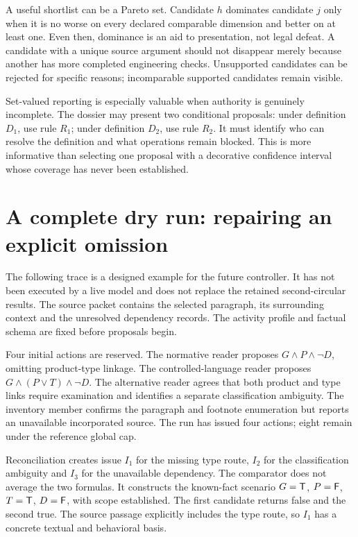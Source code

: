 A useful shortlist can be a Pareto set. Candidate $h$ dominates candidate $j$ only
when it is no worse on every declared comparable dimension and better on at least
one. Even then, dominance is an aid to presentation, not legal defeat. A candidate
with a unique source argument should not disappear merely because another has
more completed engineering checks. Unsupported candidates can be rejected for
specific reasons; incomparable supported candidates remain visible.

Set-valued reporting is especially valuable when authority is genuinely
incomplete. The dossier may present two conditional proposals: under definition
$D_1$, use rule $R_1$; under definition $D_2$, use rule $R_2$. It must identify who
can resolve the definition and what operations remain blocked. This is more
informative than selecting one proposal with a decorative confidence interval
whose coverage has never been established.

\section{A complete dry run: repairing an explicit omission}

The following trace is a designed example for the future controller. It has not
been executed by a live model and does not replace the retained second-circular
results. The source packet contains the selected paragraph, its surrounding
context and the unresolved dependency records. The activity profile and factual
schema are fixed before proposals begin.

Four initial actions are reserved. The normative reader proposes
$G\land P\land\neg D$, omitting product-type linkage. The controlled-language
reader proposes $G\land(P\lor T)\land\neg D$. The alternative reader agrees that
both product and type links require examination and identifies a separate
classification ambiguity. The inventory member confirms the paragraph and
footnote enumeration but reports an unavailable incorporated source. The run has
issued four actions; eight remain under the reference global cap.

Reconciliation creates issue $I_1$ for the missing type route, $I_2$ for the
classification ambiguity and $I_3$ for the unavailable dependency. The comparator
does not average the two formulas. It constructs the known-fact scenario
$G=\mathsf{T}$, $P=\mathsf{F}$, $T=\mathsf{T}$, $D=\mathsf{F}$, with scope established. The first
candidate returns false and the second true. The source passage explicitly
includes the type route, so $I_1$ has a concrete textual and behavioral basis.

